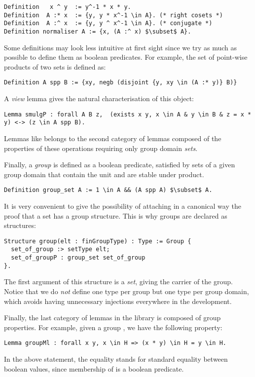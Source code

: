\begin{lstlisting}
Definition   x ^ y  := y^-1 * x * y. 
Definition  A :* x  := {y, y * x^-1 \in A}. (* right cosets *)
Definition  A :^ x  := {y, y ^ x^-1 \in A}. (* conjugate *)
Definition normaliser A := {x, (A :^ x) $\subset$ A}.
\end{lstlisting}
Some definitions may look less intuitive at first sight since
we try as much as possible to define them as boolean
predicates. For example, the set of point-wise products of 
two sets is defined as:
\begin{lstlisting}
Definition A spp B := {xy, negb (disjoint {y, xy \in (A :* y)} B)}
\end{lstlisting}
\noindent A \emph{view} lemma gives the natural characterisation of this object:
\begin{lstlisting}
Lemma smulgP : forall A B z,  (exists x y, x \in A & y \in B & z = x * y) <-> (z \in A spp B).
\end{lstlisting}
Lemmas like  belongs to the second category of lemmas 
composed of the properties of these operations requiring only group domain \emph{sets}.


Finally, a \emph{group} is defined as a boolean predicate, satisfied by
sets of a given group domain that contain the unit and are stable
under product.

\begin{lstlisting}
Definition group_set A := 1 \in A && (A spp A) $\subset$ A.\end{lstlisting}
It is very convenient to give the possibility of attaching in a
canonical way the proof that a set has a group structure. This is
why groups are declared as structures:

\begin{lstlisting}
Structure group(elt : finGroupType) : Type := Group {
  set_of_group :> setType elt;
  set_of_groupP : group_set set_of_group
}.
\end{lstlisting}
The first argument of this structure is a \emph{set}, giving the
carrier of the group. Notice that we do \emph{not} define one type per group 
but one type per group domain, which avoids having unnecessary injections
everywhere in the development.

Finally, the last category of lemmas in the library is composed of
group properties.  For example, given a group , we have the following
property:

\begin{lstlisting}
Lemma groupMl : forall x y, x \in H => (x * y) \in H = y \in H.
\end{lstlisting}
In the above statement, the equality stands for \Coq{} standard equality
between boolean values, since membership of  is a boolean
predicate.


